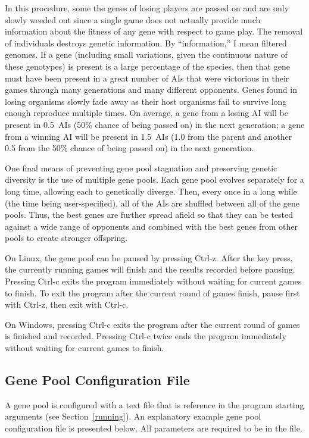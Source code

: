 \documentclass[letterpaper]{article}
\renewcommand{\_}{\allowbreak\textunderscore\allowbreak}
\begin{document}
In this procedure, some the genes of losing players are passed on and are only slowly weeded out since a single game does not actually provide much information about the fitness of any gene with respect to game play. The removal of individuals destroys genetic information. By ``information,'' I mean filtered genomes. If a gene (including small variations, given the continuous nature of these genotypes) is present is a large percentage of the species, then that gene must have been present in a great number of AIs that were victorious in their games through many generations and many different opponents. Genes found in losing organisms slowly fade away as their host organisms fail to survive long enough reproduce multiple times. On average, a gene from a losing AI will be present in 0.5~AIs (50\% chance of being passed on) in the next generation; a gene from a winning AI will be present in 1.5~AIs (1.0 from the parent and another 0.5 from the 50\% chance of being passed on) in the next generation.

One final means of preventing gene pool stagnation and preserving genetic diversity is the use of multiple gene pools. Each gene pool evolves separately for a long time, allowing each to genetically diverge. Then, every once in a long while (the time being user-specified), all of the AIs are shuffled between all of the gene pools. Thus, the best genes are further spread afield so that they can be tested against a wide range of opponents and combined with the best genes from other pools to create stronger offspring.

On Linux, the gene pool can be paused by pressing Ctrl-z. After the key press, the currently running games will finish and the results recorded before pausing. Pressing Ctrl-c exits the program immediately without waiting for current games to finish. To exit the program after the current round of games finish, pause first with Ctrl-z, then exit with Ctrl-c.

On Windows, pressing Ctrl-c exits the program after the current round of games is finished and recorded. Pressing Ctrl-c twice ends the program immediately without waiting for current games to finish.

\subsection{Gene Pool Configuration File}
A gene pool is configured with a text file that is reference in the program starting arguments (see Section~\ref{running}). An explanatory example gene pool configuration file is presented below. All parameters are required to be in the file.

\end{document}
